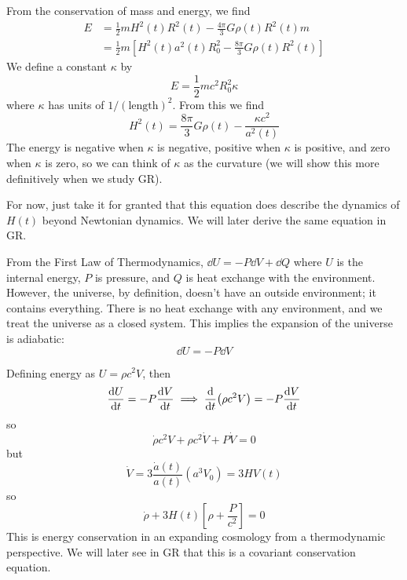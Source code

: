 \documentclass[a4paper,twoside,master.tex]{subfiles}
\begin{document}
From the conservation of mass and energy, we find
\begin{align}
    E &= \frac{1}{2} m H^2(t) R^2(t) - \frac{4 \pi}{3} G \rho(t) R^2(t) m \\
      &= \frac{1}{2} m \left[ H^2(t) a^2(t) R_0^2 - \frac{8 \pi}{3} G \rho(t) R^2(t) \right]
\end{align}
We define a constant $ \kappa $ by
\begin{equation}
    E = \frac{1}{2} m c^2 R_0^2 \kappa
\end{equation}
where $ \kappa $ has units of $ 1 / (\text{length})^2 $. From this we find
\begin{equation}
    H^2(t) = \frac{8 \pi}{3} G \rho(t) - \frac{\kappa c^2}{a^2(t)}\tag{Friedmann's Equation}
\end{equation}
The energy is negative when $ \kappa $ is negative, positive when $ \kappa $ is positive, and zero when $ \kappa $ is zero, so we can think of $ \kappa $ as the curvature (we will show this more definitively when we study GR).

For now, just take it for granted that this equation does describe the dynamics of $ H(t) $ beyond Newtonian dynamics. We will later derive the same equation in GR.

From the First Law of Thermodynamics, $ \dd{U} = -P \dd{V} + \dd{Q} $ where $ U $ is the internal energy, $ P $ is pressure, and $ Q $ is heat exchange with the environment. However, the universe, by definition, doesn't have an outside environment; it contains everything. There is no heat exchange with any environment, and we treat the universe as a closed system. This implies the expansion of the universe is adiabatic:
\begin{equation}
    \dd{U} = -P \dd{V}
\end{equation}

Defining energy as $ U = \rho c^2 V $, then
\begin{equation}
    \dv{U}{t}= - P \dv{V}{t} \implies \dv{t}(\rho c^2 V)= - P \dv{V}{t}
\end{equation}
so
\begin{equation}
    \dot{\rho} c^2 V + \rho c^2 \dot{V}+ P\dot{V} = 0
\end{equation}
but
\begin{equation}
    \dot{V} = 3 \frac{\dot{a}(t)}{a(t)} (a^3 V_0)= 3 H V(t)
\end{equation}
so
\begin{equation}
    \dot{\rho} + 3 H(t) \left[ \rho + \frac{P}{c^2} \right] = 0
\end{equation}
This is energy conservation in an expanding cosmology from a thermodynamic perspective. We will later see in GR that this is a covariant conservation equation.
\end{document}
